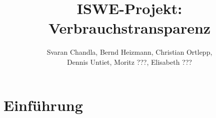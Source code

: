 \documentclass{article}
\begin{document}
\title{ISWE-Projekt: Verbrauchstransparenz}
\author{Svaran Chandla, Bernd Heizmann, Christian Ortlepp,\\ Dennis Untiet, Moritz ???, Elisabeth ???}
\maketitle   


\section{Einführung}
	
\end{document}
